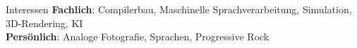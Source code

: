 \documentclass{resume} %
\begin{document}

\begin{rSection}{Interessen}
{\bf Fachlich}: Compilerbau, Maschinelle Sprachverarbeitung, Simulation, 3D-Rendering, KI \\
{\bf Persönlich}: Analoge Fotografie, Sprachen, Progressive Rock
\end{rSection}
\end{document}
